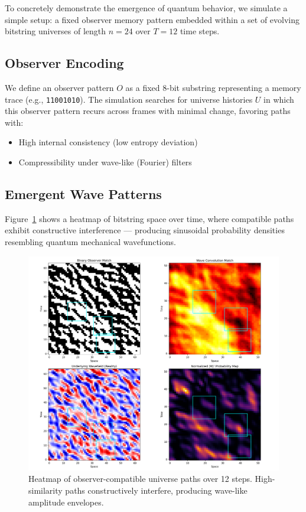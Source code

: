 \documentclass[11pt]{article}
\begin{document}
To concretely demonstrate the emergence of quantum behavior, we simulate a simple setup: a fixed observer memory pattern embedded within a set of evolving bitstring universes of length $n=24$ over $T=12$ time steps.

\subsection*{Observer Encoding}

We define an observer pattern $O$ as a fixed 8-bit substring representing a memory trace (e.g., \texttt{11001010}). The simulation searches for universe histories $U$ in which this observer pattern recurs across frames with minimal change, favoring paths with:

\begin{itemize}
      \item High internal consistency (low entropy deviation)
      \item Compressibility under wave-like (Fourier) filters
\end{itemize}

\subsection*{Emergent Wave Patterns}

Figure~\ref{fig:observer-trace} shows a heatmap of bitstring space over time, where compatible paths exhibit constructive interference — producing sinusoidal probability densities resembling quantum mechanical wavefunctions.

\begin{figure}[h!]
      \includegraphics[width=1.0\textwidth]{figures/observer_wave_evolution.png}
      \caption{Heatmap of observer-compatible universe paths over 12 steps. High-similarity paths constructively interfere, producing wave-like amplitude envelopes.}
      \label{fig:observer-trace}
\end{figure}
\end{document}
